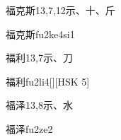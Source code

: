 \begin{entry}{福克斯}{13,7,12}{⽰、⼗、⽄}
  \begin{phonetics}{福克斯}{fu2ke4si1}
  \end{phonetics}
\end{entry}

\begin{entry}{福利}{13,7}{⽰、⼑}
  \begin{phonetics}{福利}{fu2li4}[][HSK 5]
  \end{phonetics}
\end{entry}

\begin{entry}{福泽}{13,8}{⽰、⽔}
  \begin{phonetics}{福泽}{fu2ze2}
  \end{phonetics}
\end{entry}


